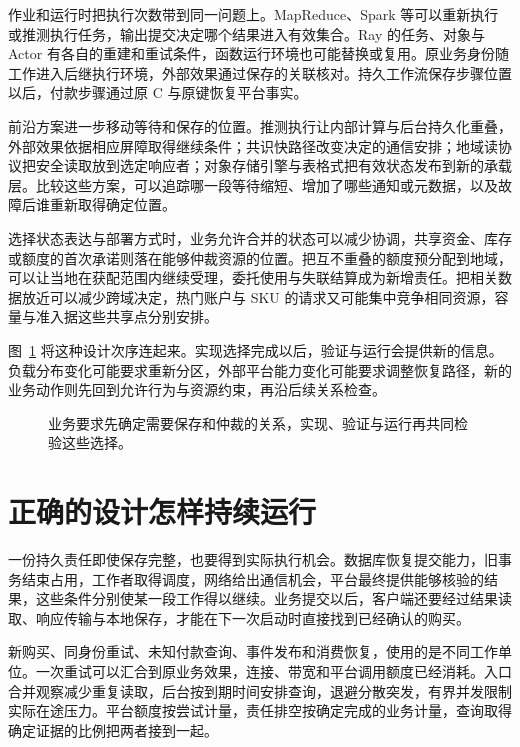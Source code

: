 作业和运行时把执行次数带到同一问题上。MapReduce、Spark 等可以重新执行或推测执行任务，输出提交决定哪个结果进入有效集合。Ray 的任务、对象与 Actor 有各自的重建和重试条件，函数运行环境也可能替换或复用。原业务身份随工作进入后继执行环境，外部效果通过保存的关联核对。持久工作流保存步骤位置以后，付款步骤通过原 C 与原键恢复平台事实。

前沿方案进一步移动等待和保存的位置。推测执行让内部计算与后台持久化重叠，外部效果依据相应屏障取得继续条件；共识快路径改变决定的通信安排；地域读协议把安全读取放到选定响应者；对象存储引擎与表格式把有效状态发布到新的承载层。比较这些方案，可以追踪哪一段等待缩短、增加了哪些通知或元数据，以及故障后谁重新取得确定位置。

选择状态表达与部署方式时，业务允许合并的状态可以减少协调，共享资金、库存或额度的首次承诺则落在能够仲裁资源的位置。把互不重叠的额度预分配到地域，可以让当地在获配范围内继续受理，委托使用与失联结算成为新增责任。把相关数据放近可以减少跨域决定，热门账户与 SKU 的请求又可能集中竞争相同资源，容量与准入据这些共享点分别安排。

图~\ref{fig:closing-design} 将这种设计次序连起来。实现选择完成以后，验证与运行会提供新的信息。负载分布变化可能要求重新分区，外部平台能力变化可能要求调整恢复路径，新的业务动作则先回到允许行为与资源约束，再沿后续关系检查。

\begin{figure}[htbp]
\centering

\caption{业务要求先确定需要保存和仲裁的关系，实现、验证与运行再共同检验这些选择。}
\label{fig:closing-design}
\end{figure}

\section*{正确的设计怎样持续运行}

一份持久责任即使保存完整，也要得到实际执行机会。数据库恢复提交能力，旧事务结束占用，工作者取得调度，网络给出通信机会，平台最终提供能够核验的结果，这些条件分别使某一段工作得以继续。业务提交以后，客户端还要经过结果读取、响应传输与本地保存，才能在下一次启动时直接找到已经确认的购买。

新购买、同身份重试、未知付款查询、事件发布和消费恢复，使用的是不同工作单位。一次重试可以汇合到原业务效果，连接、带宽和平台调用额度已经消耗。入口合并观察减少重复读取，后台按到期时间安排查询，退避分散突发，有界并发限制实际在途压力。平台额度按尝试计量，责任排空按确定完成的业务计量，查询取得确定证据的比例把两者接到一起。

